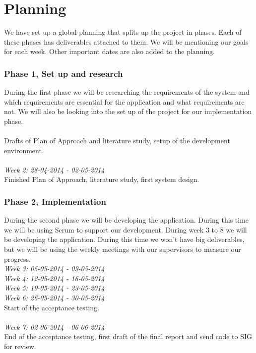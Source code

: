 \section{Planning}
We have set up a global planning that splits up the project in phases.
Each of these phases has deliverables attached to them.
We will be mentioning our goals for each week.
Other important dates are also added to the planning.

\subsubsection{Phase 1, Set up and research}
During the first phase we will be researching the requirements of the system and which requirements are essential for the application and what requirements are not.
We will also be looking into the set up of the project for our implementation phase.\\

\\
Drafts of Plan of Approach and literature study, setup of the development environment.\\
\\
\noindent\emph{Week 2: 28-04-2014 - 02-05-2014}\\
Finished Plan of Approach, literature study, first system design.

\subsubsection{Phase 2, Implementation}
During the second phase we will be developing the application.
During this time we will be using Scrum to support our development.
During week 3 to 8 we will be developing the application.
During this time we won't have big deliverables, but we will be using the weekly meetings with our supervisors to measure our progress.\\

\noindent\emph{Week 3: 05-05-2014 - 09-05-2014}\\

\noindent\emph{Week 4: 12-05-2014 - 16-05-2014}\\

\noindent\emph{Week 5: 19-05-2014 - 23-05-2014}\\

\noindent\emph{Week 6: 26-05-2014 - 30-05-2014}\\
Start of the acceptance testing.
\\\\
\noindent\emph{Week 7: 02-06-2014 - 06-06-2014}\\
End of the acceptance testing, first draft of the final report and send code to SIG for review.

